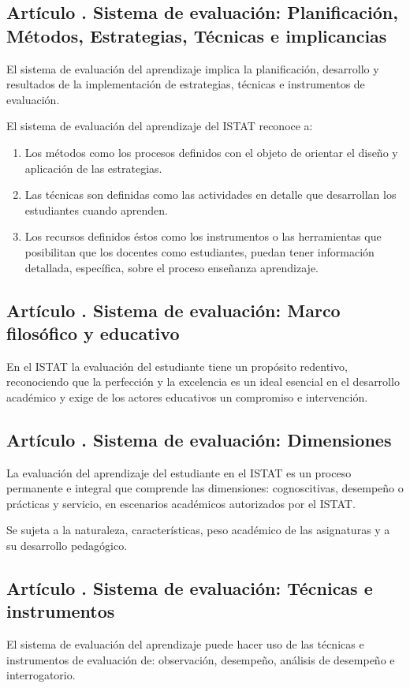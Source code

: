 \subsection{Artículo . Sistema de evaluación: Planificación, Métodos, Estrategias, Técnicas e implicancias}
\addtocounter{ns}{1}
El sistema de evaluación del aprendizaje implica la planificación, desarrollo y resultados de la implementación de estrategias, técnicas e instrumentos de evaluación.
  
El sistema de evaluación del aprendizaje del ISTAT reconoce a: 
\begin{enumerate}
\item Los métodos como los procesos definidos con el objeto de orientar el diseño y aplicación de las estrategias. 
\item Las técnicas son definidas como las actividades en detalle que desarrollan los estudiantes cuando aprenden. 
\item Los recursos definidos éstos como los instrumentos o las herramientas que posibilitan que los docentes como estudiantes, puedan tener información detallada, específica, sobre el proceso enseñanza aprendizaje.  
\end{enumerate}
\subsection{Artículo . Sistema de evaluación: Marco filosófico y educativo}
\addtocounter{ns}{1}
En el ISTAT la evaluación del estudiante tiene un propósito redentivo, reconociendo que la perfección y la excelencia es un ideal esencial en el desarrollo académico y exige de los actores educativos un compromiso e intervención.  
\subsection{Artículo . Sistema de evaluación: Dimensiones}
\addtocounter{ns}{1}
La evaluación del aprendizaje del estudiante en el ISTAT es un proceso permanente e integral que comprende las dimensiones: cognoscitivas, desempeño o prácticas y servicio, en escenarios académicos autorizados por el ISTAT.  

Se sujeta a la naturaleza, características, peso académico de las asignaturas y a su desarrollo pedagógico. 
\subsection{Artículo . Sistema de evaluación: Técnicas e instrumentos}
\addtocounter{ns}{1}
El sistema de evaluación del aprendizaje puede hacer uso de las técnicas e instrumentos de evaluación de: observación, desempeño, análisis de desempeño e interrogatorio. 

